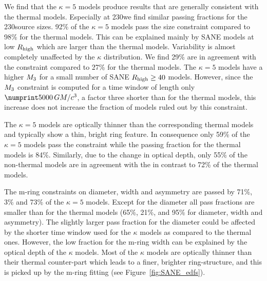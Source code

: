 
We find that the $\kappa=5$ models produce results that are generally consistent with the \bhac thermal models.
Especially at 230\GHz we find similar passing fractions for the 230\GHz source sizes.
92\% of the $\kappa=5$ models pass the size constraint compared to 98\% for the thermal models.
This can be explained mainly by SANE models at low $R_\mathrm{high}$ which are larger than the thermal models.
Variability is almost completely unaffected by the $\kappa$ distribution.
We find 29\% are in agreement with the  constraint compared to 27\% for the thermal models.
The $\kappa=5$ models have a higher $M_{3}$ for a small number of SANE $R_\mathrm{high} \geq 40$ models.
However, since the $M_{3}$ constraint is computed for a time window of length only $\no{5000}\,\tg$, a factor three shorter than for the thermal models, this increase does not increase the fraction of models ruled out by this constraint.


The $\kappa=5$ models are optically thinner than the corresponding thermal models and typically show a thin, bright ring feature.
In consequence only 59\% of the $\kappa=5$ models pass the \vam constraint while the passing fraction for the thermal models is 84\%.
Similarly, due to the change in optical depth, only 55\% of the non-thermal models are in agreement with the \vam in contrast to 72\% of the thermal models.


The m-ring constraints on diameter, width and asymmetry are passed by 71\%, 3\% and 73\% of the $\kappa=5$ models.
Except for the diameter all pass fractions are smaller than for the thermal models (65\%, 21\%, and 95\% for diameter, width and asymmetry).
The slightly larger pass fraction for the diameter could be affected by the shorter time window used for the $\kappa$ models as compared to the thermal ones.
However, the low fraction for the m-ring width can be explained by the optical depth of the $\kappa$ models.
Most of the $\kappa$ models are optically thinner than their thermal counter-part which leads to a finer, brighter ring-structure, and this is picked up by the m-ring fitting (see Figure~\ref{fig:SANE_edfs}).

